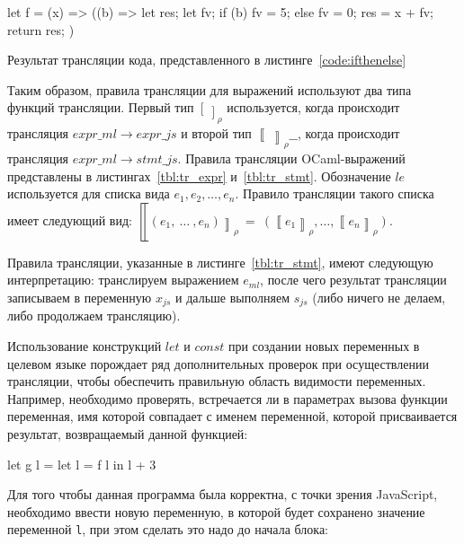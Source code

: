 \documentclass[12pt]{matmex-diploma}
\newcommand \lpar  {\mathrel{{[}}}
\newcommand \rpar  {\mathrel{{]}}}
\newcommand \llpar  {\mathrel{{\llbracket}}}
\newcommand \rrpar  {\mathrel{{\rrbracket}}}
\begin{document}
\begin{listing}
\begin{pyglist}[language=ocaml,numbers=none,numbersep=5pt, fontsize=\small]
let f = (x) => ((b) => {
    let res;
    let fv;
    if (b) {fv = 5;} else {fv = 0;}
    res = x + fv;
    return res;
})
\end{pyglist}
\caption{Результат трансляции кода, представленного в листинге~\ref{code:ifthenelse}}
\label{code:ifthenelse_tr}
\end{listing}

Таким образом, правила трансляции для выражений используют два типа функций трансляции. Первый тип $\lpar~\rpar_{\rho}$ используется, когда происходит трансляция $expr\_ml \to expr\_js$ и второй тип $\llpar~\rrpar_{\rho} \_ \_$, когда происходит трансляция $expr\_ml \to stmt\_js$. Правила трансляции OCaml-выражений представлены в листингах~\ref{tbl:tr_expr} и~\ref{tbl:tr_stmt}. Обозначение $le$ используется для списка вида $e_1, e_2, \ldots, e_n$. Правило трансляции такого списка имеет следующий вид: $\llpar (e_1, ~\ldots~, e_n) \rrpar _{\rho} ~=~ (\llpar e_1 \rrpar _{\rho}, \ldots, \llpar e_n \rrpar _{\rho})$.

Правила трансляции, указанные в листинге~\ref{tbl:tr_stmt}, имеют следующую интерпретацию: транслируем выражением $e_{ml}$, после чего результат трансляции записываем в переменную $x_{js}$ и дальше выполняем $s_{js}$ (либо ничего не делаем, либо продолжаем трансляцию).

Использование конструкций $let$ и $const$ при создании новых переменных в целевом языке порождает ряд дополнительных проверок при осуществлении трансляции, чтобы обеспечить правильную область видимости переменных. Например, необходимо проверять, встречается ли в параметрах вызова функции переменная, имя которой совпадает с именем переменной, которой присваивается результат, возвращаемый данной функцией:

\begin{listing}
\begin{pyglist}[language=ocaml,numbers=none,numbersep=5pt, fontsize=\small]
    let g l = 
        let l = f l in 
        l + 3
\end{pyglist}
\end{listing}

Для того чтобы данная программа была корректна, с точки зрения JavaScript, необходимо ввести новую переменную, в которой будет сохранено значение переменной \verb|l|, при этом сделать это надо до начала блока:
\end{document}
